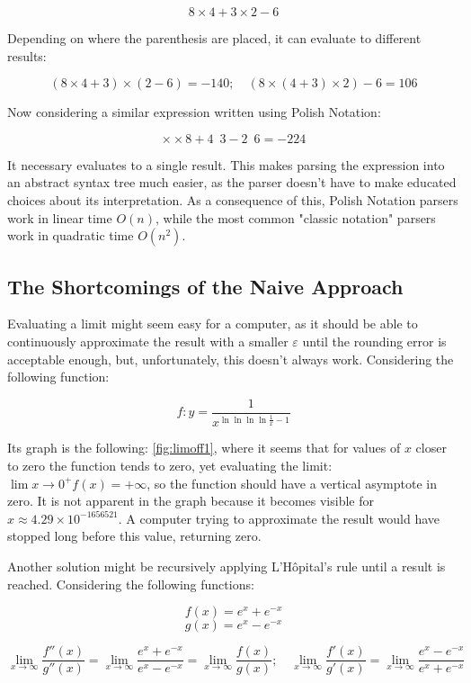 \documentclass{article}
\theoremstyle{plain}
\theoremstyle{definition}
\theoremstyle{algorithm}
\begin{document}
	\[
	8 \times 4 + 3 \times  2 - 6
	\]
	
	Depending on where the parenthesis are placed, it can evaluate to different results:
	
	\[
	(8 \times 4 + 3) \times (2 - 6) = -140; \quad (8 \times (4 + 3) \times 2) - 6 = 106 
	\]
	
	Now considering a similar expression written using Polish Notation:
	
	\[
	\times \times 8 + 4 \enspace 3 - 2 \enspace 6 = -224
	\]
	
	It necessary evaluates to a single result.
	This makes parsing the expression into an abstract syntax tree \cite{wiki:abtree} much easier, as the parser doesn't have to make educated choices about its interpretation. As a consequence of this, Polish Notation parsers work in linear time \(O(n)\), while the most common "classic notation" parsers work in quadratic time \(O(n^{2})\).
	
	\subsection{The Shortcomings of the Naive Approach}
	
	Evaluating a limit might seem easy for a computer, as it should be able to continuously approximate the result with a smaller $\varepsilon$ until the rounding error is acceptable enough, but, unfortunately, this doesn't always work.
	Considering the following function:
	
	\[
	f : y = \frac{1}{x^{\ln{\ln{\ln{\ln{\frac{1}{x}}}}}-1}} \tag{1} \label{eq:toinfinity}
	\]
	
	Its graph is the following: \cref{fig:limoff1}, where it seems that for values of \(x\) closer to zero the function tends to zero, yet evaluating the limit: \(\lim{x \to 0^{+}}{f(x) = +\infty}\), so the function should have a vertical asymptote in zero. It is not apparent in the graph because it becomes visible for \(x \approx 4.29 \times 10 ^{-1656521}\). A computer trying to approximate the result would have stopped long before this value, returning zero.
	
	Another solution might be recursively applying L'Hôpital's rule \cite{wiki:hopital} until a result is reached.
	Considering the following functions:
	
	\[
	f(x) = e^{x} + e^{-x}
	\] 
	\[
	g(x) = e^{x} - e^{-x}
	\]
	
	\[
	\lim_{x \to \infty}{\frac{f''(x)}{g''(x)}} = \lim_{x \to \infty}{\frac{e^{x} + e^{-x}}{e^{x} - e^{-x}}} = \lim_{x \to \infty}{\frac{f(x)}{g(x)}}; \quad \lim_{x \to \infty}{\frac{f'(x)}{g'(x)}} = \lim_{x \to \infty}{\frac{e^{x} - e^{-x}}{e^{x} + e^{-x}}}
	\]
	
\end{document}
